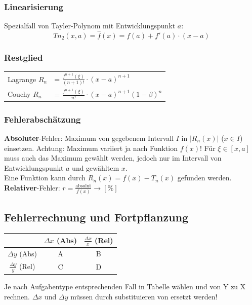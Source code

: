 \subsubsection{Linearisierung}
Spezialfall von Tayler-Polynom mit Entwicklungspunkt $a$:
\[Tn_2(x, a) = \hat{f}(x) = f(a) + f'(a)\cdot(x - a)\]

\subsubsection{Restglied}
\begin{tabular}{ll}
	Lagrange $R_n$ &= $\frac{f^{n + 1}(\xi)}{(n + 1)!} \cdot (x - a)^{n+1}$\\
	Couchy $R_n$ &= $\frac{f^{n + 1}(\xi)}{n!} \cdot (x - a)^{n+1} (1 - \beta)^n$
\end{tabular}


\subsubsection{Fehlerabschätzung}
\textbf{Absoluter}-Fehler: Maximum von gegebenem Intervall $I$ in $\left|R_n(x)\right|$ ($x \in I$) einsetzen. Achtung: Maximum variiert ja nach Funktion $f(x)$! Für $\xi \in [x, a]$ muss auch das Maximum gewählt werden, jedoch nur im Intervall von Entwicklungspunkt $a$ und gewähltem $x$.\\

\noindent Eine Funktion kann durch $R_n(x) = f(x) - T_n(x)$ gefunden werden.\\

\noindent\textbf{Relativer}-Fehler: $r = \frac{\text{absolut}}{f(x)} \rightarrow [\%]$

\subsection{Fehlerrechnung und Fortpflanzung}
\begin{center}
	\begin{tabular}{c|c|c|}
		\diagbox{Y}{X} & $\Delta x$ (Abs) & $\frac{\Delta x}{x}$ (Rel) \\
		\midrule
		$\Delta y$ (Abs) & A & B \\
		\midrule
		$\frac{\Delta y}{y}$ (Rel) & C & D
	\end{tabular}
\end{center}

\noindent Je nach Aufgabentype entsprechenden Fall in Tabelle wählen und von Y zu X rechnen. $\Delta x$ und $\Delta y$ müssen durch substituieren von  ersetzt werden!

